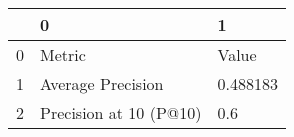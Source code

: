 \begin{tabular}{lll}
\toprule
{} &                       0 &         1 \\
\midrule
0 &                  Metric &     Value \\
1 &       Average Precision &  0.488183 \\
2 &  Precision at 10 (P@10) &       0.6 \\
\bottomrule
\end{tabular}
